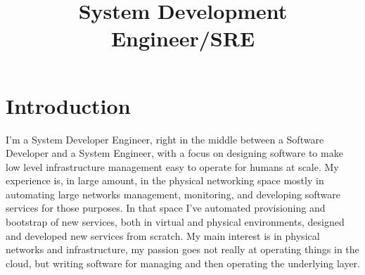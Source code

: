 \documentclass[11pt,a4paper,sans]{moderncv}        %
\title{System Development Engineer/SRE}                               %
\begin{document}
\makecvtitle

\section{Introduction}
I'm a System Developer Engineer, right in the middle between a Software Developer and a System Engineer, with a focus on designing software to make low level infrastructure management easy to operate for humans at scale.\newline{}
My experience is, in large amount, in the physical networking space mostly in automating large networks management, monitoring, and developing software services for those purposes.\newline{}
In that space I've automated provisioning and bootstrap of new services, both in virtual and physical environments, designed and developed new services from scratch.\newline{}
My main interest is in physical networks and infrastructure, my passion goes not really at operating things in the cloud, but writing software for managing and then operating the underlying layer.
\end{document}
